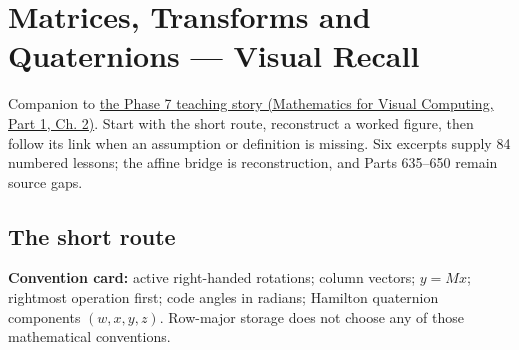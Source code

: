 \hypertarget{appendix-68f22c734be3}{}\label{referencestart:appendix-68f22c734be3}
\section{Matrices, Transforms and Quaternions --- Visual Recall}\label{appendix-68f22c734be3-matrices-transforms-and-quaternions-visual-recall}

\hypertarget{appendix-68f22c734be3-matrices-transforms-and-quaternions-visual-recall}{}

Companion to \href{../02-Mathematics-for-Visual-Computing-P01/main.pdf\#01-foundations-i-ch018-keep-the-promises-visible-while-moving-between-representations}{the Phase 7 teaching story (Mathematics for Visual Computing, Part 1, Ch. 2)}. Start with the short route, reconstruct a worked figure, then follow its link when an assumption or definition is missing. Six excerpts supply 84 numbered lessons; the affine bridge is reconstruction, and Parts 635--650 remain source gaps.

\subsection{The short route}\label{appendix-68f22c734be3-the-short-route}

\hypertarget{appendix-68f22c734be3-the-short-route}{}


\textbf{Convention card:} active right-handed rotations; column vectors; \(y=Mx\); rightmost operation first; code angles in radians; Hamilton quaternion components \((w,x,y,z)\). Row-major storage does not choose any of those mathematical conventions.

